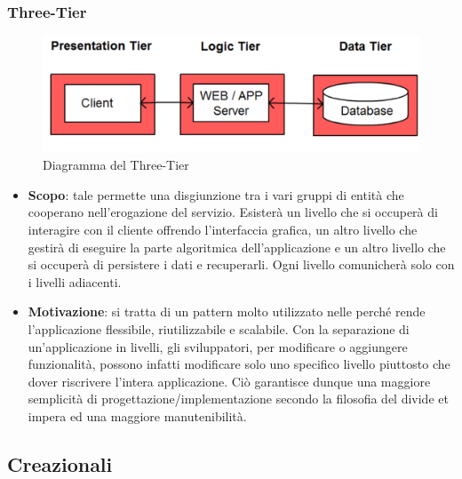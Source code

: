 		\subsubsection{Three-Tier}
		\begin{figure}[H]
		\centering
		\includegraphics[width=0.6\linewidth]{GraficiAppendici/3-tier.png}
		\caption{Diagramma del  Three-Tier}
	\end{figure}
		\begin{itemize}
		\item \textbf{Scopo}: tale  permette una disgiunzione tra i vari gruppi di
entità che cooperano nell’erogazione del servizio. Esisterà un livello che si occuperà
di interagire con il cliente offrendo l’interfaccia grafica, un altro livello che gestirà
di eseguire la parte algoritmica dell’applicazione e un altro livello che si occuperà di
persistere i dati e recuperarli. Ogni livello comunicherà solo con i livelli adiacenti.

	\item \textbf{Motivazione}: si tratta di un pattern molto utilizzato nelle  perché rende l’applicazione flessibile, riutilizzabile e scalabile. Con la separazione di un’applicazione in livelli, gli sviluppatori, per modificare o aggiungere funzionalità, possono infatti modificare solo uno specifico livello piuttosto che dover riscrivere l’intera applicazione. Ciò garantisce dunque una maggiore semplicità di progettazione/implementazione secondo la filosofia del divide et impera ed una maggiore manutenibilità.
		\end{itemize}
	\subsection{ Creazionali}

